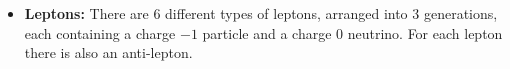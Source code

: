 \begin{itemize}[leftmargin=*]
\item\textbf{Leptons:}
  There are 6 different types of leptons,
  arranged into  3 generations, each containing a charge $-1$ particle and a charge 0 neutrino.
  For each lepton there is also an anti-lepton. \vspace{1em}

 

\end{itemize}
